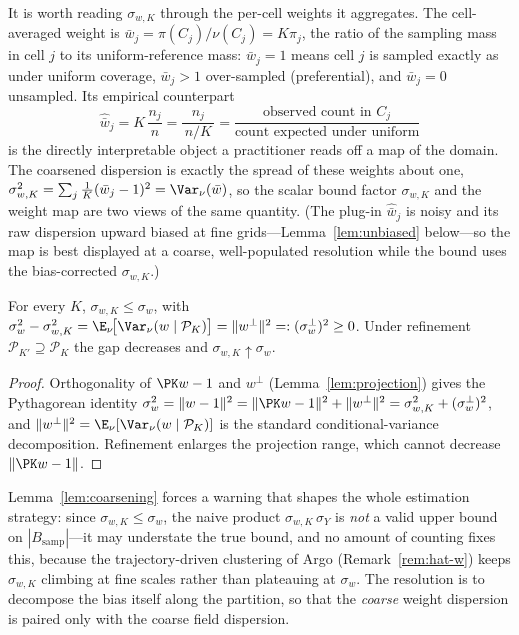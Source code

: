 It is worth reading $\sigma_{w,K}$ through the per-cell weights it
aggregates. The cell-averaged weight is
$\bar w_j=\pi(C_j)/\nu(C_j)=K\pi_j$, the ratio of the sampling mass in
cell $j$ to its uniform-reference mass: $\bar w_j=1$ means cell $j$ is
sampled exactly as under uniform coverage, $\bar w_j>1$ over-sampled
(preferential), and $\bar w_j=0$ unsampled. Its empirical counterpart
\[
  \widehat{\bar w}_j=K\,\frac{n_j}{n}=\frac{n_j}{\,n/K\,}
  =\frac{\text{observed count in }C_j}{\text{count expected under uniform}}
\]
is the directly interpretable object a practitioner reads off a map of
the domain. The coarsened dispersion is exactly the spread of these
weights about one,
$\sigma_{w,K}^2=\sum_j\tfrac1K(\bar w_j-1)^2=\Var_\nu(\bar w)$, so the
scalar bound factor $\sigma_{w,K}$ and the weight map are two views of
the same quantity. (The plug-in $\widehat{\bar w}_j$ is noisy and its
raw dispersion upward biased at fine grids---Lemma~\ref{lem:unbiased}
below---so the map is best displayed at a coarse, well-populated
resolution while the bound uses the bias-corrected $\sigma_{w,K}$.)

\begin{lemma}
\label{lem:coarsening}
For every $K$, $\sigma_{w,K}\le\sigma_w$, with
$\sigma_w^2-\sigma_{w,K}^2=\E_\nu\!\big[\Var_\nu(w\mid\mathcal{P}_K)\big]
=\|w^{\perp}\|^2=:(\sigma_w^{\perp})^2\ge0$. Under refinement
$\mathcal{P}_{K'}\supseteq\mathcal{P}_K$ the gap decreases and
$\sigma_{w,K}\uparrow\sigma_w$.
\end{lemma}

\begin{proof}
Orthogonality of $\PK w-1$ and $w^{\perp}$ (Lemma~\ref{lem:projection})
gives the Pythagorean
identity $\sigma_w^2=\|w-1\|^2=\|\PK w-1\|^2+\|w^{\perp}\|^2
=\sigma_{w,K}^2+(\sigma_w^{\perp})^2$, and
$\|w^{\perp}\|^2=\E_\nu[\Var_\nu(w\mid\mathcal{P}_K)]$ is the standard
conditional-variance decomposition. Refinement enlarges the projection
range, which cannot decrease $\|\PK w-1\|$.
\end{proof}

Lemma~\ref{lem:coarsening} forces a warning that shapes the whole
estimation strategy: since $\sigma_{w,K}\le\sigma_w$, the naive product
$\sigma_{w,K}\,\sigma_Y$ is \emph{not} a valid upper bound on
$|B_{\mathrm{samp}}|$---it may understate the true bound, and no amount
of counting fixes this, because the trajectory-driven clustering of
Argo (Remark~\ref{rem:hat-w}) keeps $\sigma_{w,K}$ climbing at fine
scales rather than plateauing at $\sigma_w$. The resolution is to
decompose the bias itself along the partition, so that the
\emph{coarse} weight dispersion is paired only with the coarse field
dispersion.

